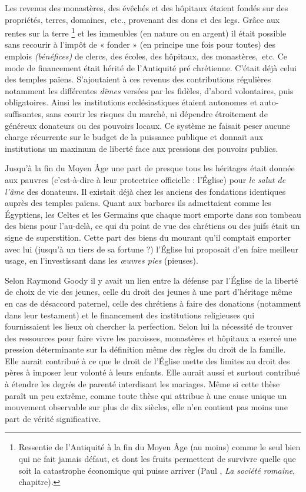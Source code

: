  Les revenus des monastères, des évêchés et des hôpitaux étaient fondés sur des propriétés, terres, domaines,~etc., provenant des dons et des legs. Grâce aux rentes sur la terre%
\footnote{Ressentie de l'Antiquité à la fin du Moyen Âge (au moins) comme le seul bien qui ne fait jamais défaut, et dont les fruits permettent de survivre quelle que soit la catastrophe économique qui puisse arriver (Paul , \emph{La société romaine}, chapitre).} 
et les immeubles (en nature ou en argent) il était possible sans recourir à l'impôt de « fonder » (en principe une fois pour toutes) des emplois \emph{(bénéfices)} de clercs, des écoles, des hôpitaux, des monastères,~etc. Ce mode de financement était hérité de l'Antiquité pré chrétienne. C'était déjà celui des temples païens. S'ajoutaient à ces revenus des contributions régulières notamment les différentes \emph{dîmes} versées par les fidèles, d'abord volontaires, puis obligatoires. Ainsi les institutions ecclésiastiques étaient autonomes et auto-suffisantes, sans courir les risques du marché, ni dépendre étroitement de généreux donateurs ou des pouvoirs locaux. Ce système ne faisait peser aucune charge récurrente sur le budget de la puissance publique et donnait aux institutions un maximum de liberté face aux pressions des pouvoirs publics. 

 Jusqu'à la fin du Moyen Âge une part de presque tous les héritages était donnée aux pauvres (c'est-à-dire à leur protectrice officielle : l'Église) pour \emph{le salut de l'âme} des donateurs. Il existait déjà chez les anciens des fondations identiques auprès des temples païens. Quant aux barbares ils admettaient comme les Égyptiens, les Celtes et les Germains que chaque mort emporte dans son tombeau des biens pour l'au-delà, ce qui du point de vue des chrétiens ou des juifs était un signe de superstition. Cette part des biens du mourant qu'il comptait emporter avec lui (jusqu'à un tiers de sa fortune ?) l'Église lui proposait d'en faire meilleur usage, en l'investissant dans les \emph{œuvres pies} (pieuses). 

 Selon Raymond Goody il y avait un lien entre la défense par l'Église de la liberté de choix de vie des jeunes, celle du droit des jeunes à une part d'héritage même en cas de désaccord paternel, celle des chrétiens à faire des donations (notamment dans leur testament) et le financement des institutions religieuses qui fournissaient les lieux où chercher la perfection. Selon lui la nécessité de trouver des ressources pour faire vivre les paroisses, monastères et hôpitaux a exercé une pression déterminante sur la définition même des règles du droit de la famille. Elle aurait contribué à ce que le droit de l'Église mette des limites au droit des pères à imposer leur volonté à leurs enfants. Elle aurait aussi et surtout contribué à étendre les degrés de parenté interdisant les mariages. Même si cette thèse paraît un peu extrême, comme toute thèse qui attribue à une cause unique un mouvement observable sur plus de dix siècles, elle n'en contient pas moins une part de vérité significative. 

